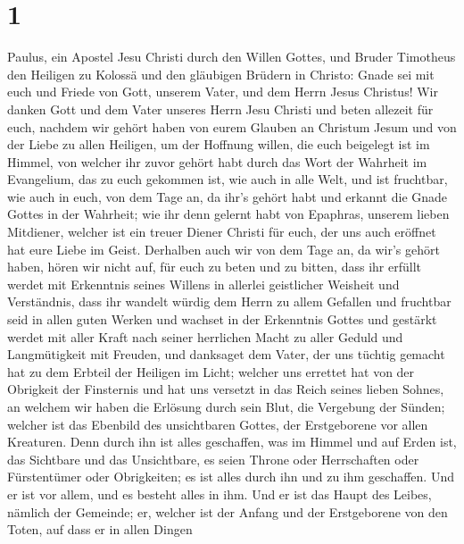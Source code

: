 \hypertarget{section}{%
\section{1}\label{section}}

 Paulus, ein Apostel Jesu Christi durch den Willen Gottes,
und Bruder Timotheus  den Heiligen zu Kolossä und den
gläubigen Brüdern in Christo: Gnade sei mit euch und Friede von Gott,
unserem Vater, und dem Herrn Jesus Christus!  Wir danken
Gott und dem Vater unseres Herrn Jesu Christi und beten allezeit für
euch,  nachdem wir gehört haben von eurem Glauben an
Christum Jesum und von der Liebe zu allen Heiligen,  um der
Hoffnung willen, die euch beigelegt ist im Himmel, von welcher ihr zuvor
gehört habt durch das Wort der Wahrheit im Evangelium,  das
zu euch gekommen ist, wie auch in alle Welt, und ist fruchtbar, wie auch
in euch, von dem Tage an, da ihr's gehört habt und erkannt die Gnade
Gottes in der Wahrheit;  wie ihr denn gelernt habt von
Epaphras, unserem lieben Mitdiener, welcher ist ein treuer Diener
Christi für euch,  der uns auch eröffnet hat eure Liebe im
Geist.  Derhalben auch wir von dem Tage an, da wir's gehört
haben, hören wir nicht auf, für euch zu beten und zu bitten, dass ihr
erfüllt werdet mit Erkenntnis seines Willens in allerlei geistlicher
Weisheit und Verständnis,  dass ihr wandelt würdig dem
Herrn zu allem Gefallen und fruchtbar seid in allen guten Werken
 und wachset in der Erkenntnis Gottes und gestärkt werdet
mit aller Kraft nach seiner herrlichen Macht zu aller Geduld und
Langmütigkeit mit Freuden,  und danksaget dem Vater, der
uns tüchtig gemacht hat zu dem Erbteil der Heiligen im Licht;
 welcher uns errettet hat von der Obrigkeit der Finsternis
und hat uns versetzt in das Reich seines lieben Sohnes,  an
welchem wir haben die Erlösung durch sein Blut, die Vergebung der
Sünden;  welcher ist das Ebenbild des unsichtbaren Gottes,
der Erstgeborene vor allen Kreaturen.  Denn durch ihn ist
alles geschaffen, was im Himmel und auf Erden ist, das Sichtbare und das
Unsichtbare, es seien Throne oder Herrschaften oder Fürstentümer oder
Obrigkeiten; es ist alles durch ihn und zu ihm geschaffen. 
Und er ist vor allem, und es besteht alles in ihm.  Und er
ist das Haupt des Leibes, nämlich der Gemeinde; er, welcher ist der
Anfang und der Erstgeborene von den Toten, auf dass er in allen Dingen
